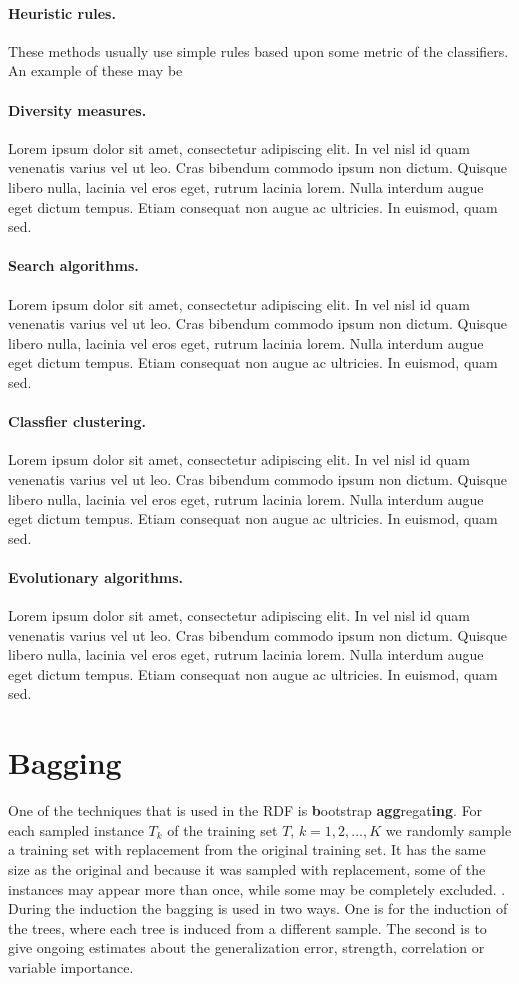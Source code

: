 \documentclass[thesis=B,english]{FITthesis}[2012/10/20]
\begin{document}
	\paragraph*{Heuristic rules.} These methods usually use simple rules based upon some metric of the classifiers. An example of these may be 
	\paragraph*{Diversity measures.} Lorem ipsum dolor sit amet, consectetur adipiscing elit. In vel nisl id quam venenatis varius vel ut leo. Cras bibendum commodo ipsum non dictum. Quisque libero nulla, lacinia vel eros eget, rutrum lacinia lorem. Nulla interdum augue eget dictum tempus. Etiam consequat non augue ac ultricies. In euismod, quam sed.
	\paragraph*{Search algorithms.}Lorem ipsum dolor sit amet, consectetur adipiscing elit. In vel nisl id quam venenatis varius vel ut leo. Cras bibendum commodo ipsum non dictum. Quisque libero nulla, lacinia vel eros eget, rutrum lacinia lorem. Nulla interdum augue eget dictum tempus. Etiam consequat non augue ac ultricies. In euismod, quam sed.
	\paragraph*{Classfier clustering.} Lorem ipsum dolor sit amet, consectetur adipiscing elit. In vel nisl id quam venenatis varius vel ut leo. Cras bibendum commodo ipsum non dictum. Quisque libero nulla, lacinia vel eros eget, rutrum lacinia lorem. Nulla interdum augue eget dictum tempus. Etiam consequat non augue ac ultricies. In euismod, quam sed.
	\paragraph*{Evolutionary algorithms.} Lorem ipsum dolor sit amet, consectetur adipiscing elit. In vel nisl id quam venenatis varius vel ut leo. Cras bibendum commodo ipsum non dictum. Quisque libero nulla, lacinia vel eros eget, rutrum lacinia lorem. Nulla interdum augue eget dictum tempus. Etiam consequat non augue ac ultricies. In euismod, quam sed.

	\section{Bagging}
	One of the techniques that is used in the RDF is \textbf{b}ootstrap \textbf{agg}regat\textbf{ing}. For each sampled instance \(T_k\) of the training set \(T\), \(k = 1, 2, \dots, K \) we randomly sample a training set with replacement from the original training set. It has the same size as the original and because it was sampled with replacement, some of the instances may appear more than once, while some may be completely excluded. \cite{quinlan1996bagging}. During the induction the bagging is used in two ways. One is for the induction of the trees, where each tree is induced from a different sample. The second is to give ongoing estimates about the generalization error, strength, correlation or variable importance.
\end{document}

